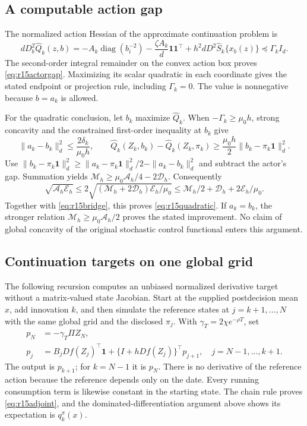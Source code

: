 \subsection{A computable action gap}
The normalized action Hessian of the approximate continuation problem is
\[
 dD_b^2\widehat Q_k(z,b)
 =-A_k\operatorname{diag}(b_i^{-2})
      -\frac{\zeta A_k}{d}\bm1\bm1^\top
      +h^2dD^2\widehat S_k\{x_b(z)\}
 \preceq\Gamma_k I_d.
\]
The second-order integral remainder on the convex action box proves
\eqref{eq:r15actorgap}. Maximizing its scalar quadratic in each
coordinate gives the stated endpoint or projection rule, including
$\Gamma_k=0$. The value is nonnegative because $b=a_k$ is allowed.

For the quadratic conclusion, let $b_k$ maximize $\widehat Q_k$.
When $-\Gamma_k\geq\mu_0h$, strong concavity and the constrained
first-order inequality at $b_k$ give
\[
 \|a_k-b_k\|_d^2\leq\frac{2\delta_k}{\mu_0h},\qquad
 \widehat Q_k(Z_k,b_k)-\widehat Q_k(Z_k,\pi_k)
                  \geq\frac{\mu_0h}{2}\|b_k-\pi_k\bm1\|_d^2.
\]
Use
$\|b_k-\pi_k\bm1\|_d^2\geq
\|a_k-\pi_k\bm1\|_d^2/2-\|a_k-b_k\|_d^2$
and subtract the actor's gap. Summation yields
$\mathcal M_h\geq\mu_0\mathcal A_h/4-2\mathcal D_h$.
Consequently
\[
 \sqrt{\mathcal A_h\mathcal E_h}
 \leq2\sqrt{(\mathcal M_h+2\mathcal D_h)\mathcal E_h/\mu_0}
 \leq\mathcal M_h/2+\mathcal D_h+2\mathcal E_h/\mu_0.
\]
Together with \eqref{eq:r15bridge}, this proves
\eqref{eq:r15quadratic}. If $a_k=b_k$, the stronger relation
$\mathcal M_h\geq\mu_0\mathcal A_h/2$ proves the stated improvement.
No claim of global concavity of the original stochastic control
functional enters this argument.

\subsection{Continuation targets on one global grid}
The following recursion computes an unbiased normalized derivative
target without a matrix-valued state Jacobian. Start at the supplied
postdecision mean $x$, add innovation $k$, and then simulate the
reference states at $j=k+1,\ldots,N$ with the same global grid and
the disclosed $\pi_j$. With
$\gamma_T=2\chi e^{-\rho T}$, set
\begin{equation}
 \begin{aligned}
 p_N&=-\gamma_T\Pi Z_N,\\
 p_j&=B_j Df(Z_j)^\top\bm1
               +\{I+hDf(Z_j)\}^\top p_{j+1},
       \quad j=N-1,\ldots,k+1.
 \end{aligned}
 \label{eq:r15adjoint}
\end{equation}
The output is $p_{k+1}$; for $k=N-1$ it is $p_N$.
There is no derivative of the reference action because the reference
depends only on the date. Every running consumption term is likewise
constant in the starting state. The chain rule proves
\eqref{eq:r15adjoint}, and the dominated-differentiation argument above
shows its expectation is $q_k^\pi(x)$.


